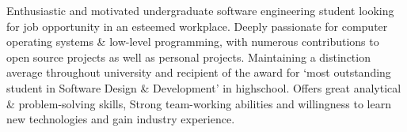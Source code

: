 

\begin{cvparagraph}

  Enthusiastic and motivated undergraduate software engineering student looking for job opportunity in an esteemed workplace. Deeply passionate for computer operating systems \& low-level programming, with numerous contributions to open source projects as well as personal projects. Maintaining a distinction average throughout university and recipient of the award for ‘most outstanding student in Software Design \& Development’ in highschool.
Offers great analytical \& problem-solving skills, Strong team-working abilities and willingness to learn new technologies and gain industry experience.

\end{cvparagraph}
